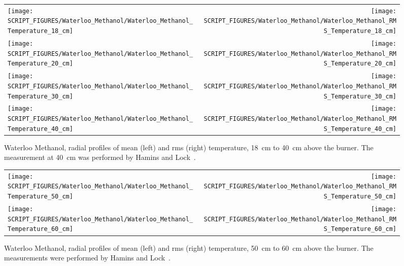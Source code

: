 \begin{figure}[p]
\begin{tabular*}{\textwidth}{l@{\extracolsep{\fill}}r}
\texttt{[image: SCRIPT\_FIGURES/Waterloo\_Methanol/Waterloo\_Methanol\_Temperature\_18\_cm]} &
\texttt{[image: SCRIPT\_FIGURES/Waterloo\_Methanol/Waterloo\_Methanol\_RMS\_Temperature\_18\_cm]} \\
\texttt{[image: SCRIPT\_FIGURES/Waterloo\_Methanol/Waterloo\_Methanol\_Temperature\_20\_cm]} &
\texttt{[image: SCRIPT\_FIGURES/Waterloo\_Methanol/Waterloo\_Methanol\_RMS\_Temperature\_20\_cm]} \\
\texttt{[image: SCRIPT\_FIGURES/Waterloo\_Methanol/Waterloo\_Methanol\_Temperature\_30\_cm]} &
\texttt{[image: SCRIPT\_FIGURES/Waterloo\_Methanol/Waterloo\_Methanol\_RMS\_Temperature\_30\_cm]} \\
\texttt{[image: SCRIPT\_FIGURES/Waterloo\_Methanol/Waterloo\_Methanol\_Temperature\_40\_cm]} &
\texttt{[image: SCRIPT\_FIGURES/Waterloo\_Methanol/Waterloo\_Methanol\_RMS\_Temperature\_40\_cm]}
\end{tabular*}
\caption[Waterloo Methanol, radial mean and rms temperature, 18~cm to 40~cm above burner]
{Waterloo Methanol, radial profiles of mean (left) and rms (right) temperature, 18~cm to 40~cm above the burner. The measurement at 40~cm was performed by Hamins and Lock~\cite{Hamins:TN1928}.}
\label{Water_Methanol_Plume_Temp_3}
\end{figure}

\begin{figure}[p]
\begin{tabular*}{\textwidth}{l@{\extracolsep{\fill}}r}
\texttt{[image: SCRIPT\_FIGURES/Waterloo\_Methanol/Waterloo\_Methanol\_Temperature\_50\_cm]} &
\texttt{[image: SCRIPT\_FIGURES/Waterloo\_Methanol/Waterloo\_Methanol\_RMS\_Temperature\_50\_cm]} \\
\texttt{[image: SCRIPT\_FIGURES/Waterloo\_Methanol/Waterloo\_Methanol\_Temperature\_60\_cm]} &
\texttt{[image: SCRIPT\_FIGURES/Waterloo\_Methanol/Waterloo\_Methanol\_RMS\_Temperature\_60\_cm]}
\end{tabular*}
\caption[Waterloo Methanol, radial mean and rms temperature, 50~cm to 60~cm above burner]
{Waterloo Methanol, radial profiles of mean (left) and rms (right) temperature, 50~cm to 60~cm above the burner. The measurements were performed by Hamins and Lock~\cite{Hamins:TN1928}.}
\label{Water_Methanol_Plume_Temp_4}
\end{figure}



